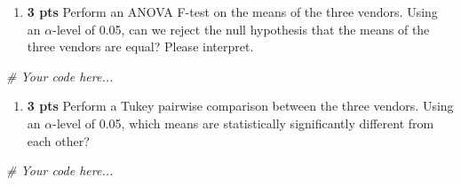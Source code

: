 \documentclass[
]{article}
\newenvironment{Shaded}{\begin{snugshade}}{\end{snugshade}}
\newcommand{\CommentTok}[1]{\textcolor[rgb]{0.56,0.35,0.01}{\textit{#1}}}
\providecommand{\tightlist}{%
  \setlength{\itemsep}{0pt}\setlength{\parskip}{0pt}}
\begin{document}
\begin{enumerate}
\def\labelenumi{\arabic{enumi}.}
\setcounter{enumi}{1}
\tightlist
\item
  \textbf{3 pts} Perform an ANOVA F-test on the means of the three
  vendors. Using an \(\alpha\)-level of 0.05, can we reject the null
  hypothesis that the means of the three vendors are equal? Please
  interpret.
\end{enumerate}

\begin{Shaded}
\begin{Highlighting}[]
\CommentTok{\# Your code here...}
\end{Highlighting}
\end{Shaded}

\begin{enumerate}
\def\labelenumi{\arabic{enumi}.}
\setcounter{enumi}{2}
\tightlist
\item
  \textbf{3 pts} Perform a Tukey pairwise comparison between the three
  vendors. Using an \(\alpha\)-level of 0.05, which means are
  statistically significantly different from each other?
\end{enumerate}

\begin{Shaded}
\begin{Highlighting}[]
\CommentTok{\# Your code here...}
\end{Highlighting}
\end{Shaded}
\end{document}
